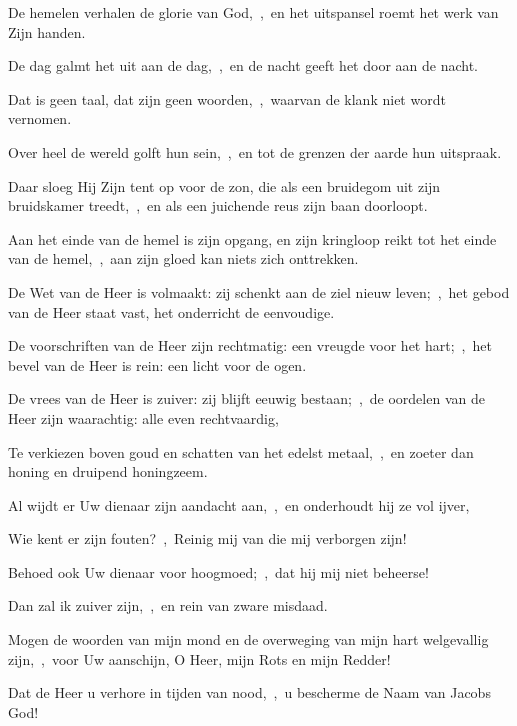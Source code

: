 \documentclass[12pt,twoside,a5paper]{article}
\begin{document}

\begin{halfparskip}
   De hemelen verhalen de glorie van God,~\sep\ en het uitspansel roemt het werk van Zijn handen.


  De dag galmt het uit aan de dag,~\sep\ en de nacht geeft het door aan de nacht.

  Dat is geen taal, dat zijn geen woorden,~\sep\ waarvan de klank niet wordt vernomen.

  Over heel de wereld golft hun sein,~\sep\ en tot de grenzen der aarde hun uitspraak.

  Daar sloeg Hij Zijn tent op voor de zon, die als een bruidegom uit zijn bruidskamer treedt,~\sep\ en als een juichende reus zijn baan doorloopt.

  Aan het einde van de hemel is zijn opgang, en zijn kringloop reikt tot het einde van de hemel,~\sep\ aan zijn gloed kan niets zich onttrekken.

  De Wet van de Heer is volmaakt: zij schenkt aan de ziel nieuw leven;~\sep\ het gebod van de Heer staat vast, het onderricht de eenvoudige.

  De voorschriften van de Heer zijn rechtmatig: een vreugde voor het hart;~\sep\ het bevel van de Heer is rein: een licht voor de ogen.

  De vrees van de Heer is zuiver: zij blijft eeuwig bestaan;~\sep\ de oordelen van de Heer zijn waarachtig: alle even rechtvaardig,

  Te verkiezen boven goud en schatten van het edelst metaal,~\sep\ en zoeter dan honing en druipend honingzeem.

  Al wijdt er Uw dienaar zijn aandacht aan,~\sep\ en onderhoudt hij ze vol ijver,

  Wie kent er zijn fouten?~\sep\ Reinig mij van die mij verborgen zijn!

  Behoed ook Uw dienaar voor hoogmoed;~\sep\ dat hij mij niet beheerse!

  Dan zal ik zuiver zijn,~\sep\ en rein van zware misdaad.

  Mogen de woorden van mijn mond en de overweging van mijn hart welgevallig zijn,~\sep\ voor Uw aanschijn, O Heer, mijn Rots en mijn Redder!

   Dat de Heer u verhore in tijden van nood,~\sep\ u bescherme de Naam van Jacobs God!


\end{halfparskip}
\end{document}
